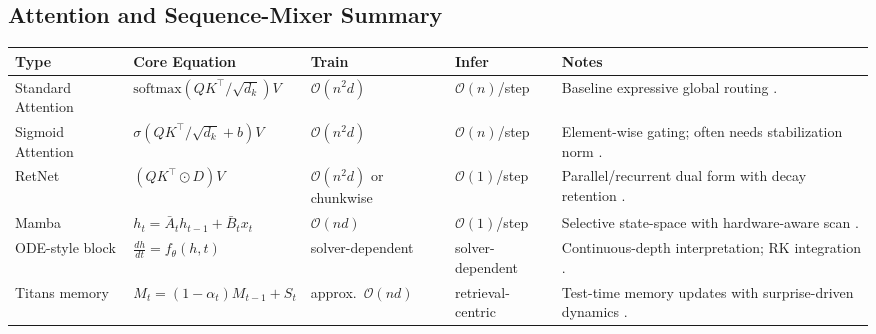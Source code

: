 \documentclass[11pt,a4paper]{article}
\begin{document}
\subsection{Attention and Sequence-Mixer Summary}
\small
\begin{longtable}{p{2.4cm}p{3.2cm}p{2.0cm}p{2.0cm}p{4.8cm}}
\toprule
\textbf{Type} & \textbf{Core Equation} & \textbf{Train} & \textbf{Infer} & \textbf{Notes} \\
\midrule
\endhead
Standard Attention & $\text{softmax}(QK^\top/\sqrt{d_k})V$ & $\mathcal{O}(n^2d)$ & $\mathcal{O}(n)$/step & Baseline expressive global routing \citep{vaswani_attention_2017}. \\
Sigmoid Attention & $\sigma(QK^\top/\sqrt{d_k}+b)V$ & $\mathcal{O}(n^2d)$ & $\mathcal{O}(n)$/step & Element-wise gating; often needs stabilization norm \citep{ramapuram_theory_2024}. \\
RetNet & $(QK^\top\odot D)V$ & $\mathcal{O}(n^2d)$ or chunkwise & $\mathcal{O}(1)$/step & Parallel/recurrent dual form with decay retention \citep{sun_retentive_2023}. \\
Mamba & $h_t=\bar{A}_t h_{t-1}+\bar{B}_t x_t$ & $\mathcal{O}(nd)$ & $\mathcal{O}(1)$/step & Selective state-space with hardware-aware scan \citep{gu_mamba_2023}. \\
ODE-style block & $\frac{dh}{dt}=f_\theta(h,t)$ & solver-dependent & solver-dependent & Continuous-depth interpretation; RK integration \citep{zhang_continuous_2021}. \\
Titans memory & $M_t=(1-\alpha_t)M_{t-1}+S_t$ & approx.\ $\mathcal{O}(nd)$ & retrieval-centric & Test-time memory updates with surprise-driven dynamics \citep{behrouz_titans_2025}. \\
\bottomrule
\end{longtable}
\normalsize
\end{document}
